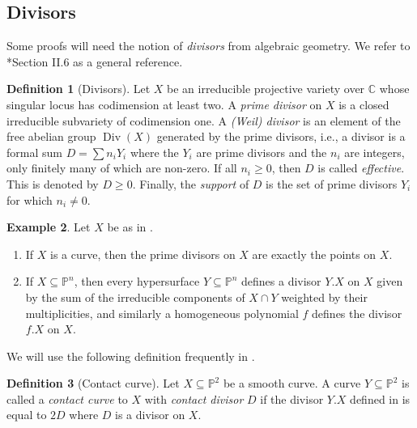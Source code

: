 \documentclass[a4paper,10pt]{amsart}
\theoremstyle{definition}
\newtheorem{Def}{Definition}[section]
\newtheorem{ex}[Def]{Example}
\theoremstyle{plain}
\newcommand{\Div}{\operatorname{Div}}
\newcommand{\C}{{\mathbb C}}
\newcommand{\pp}{\mathbb{P}}
\begin{document}
\subsection{Divisors}
Some proofs will need the notion of \emph{divisors} from algebraic geometry. We refer to \cite{Hartshorne1977AG}*{Section II.6} as a general reference.
\begin{Def}[Divisors]\label{def:divisors}
    Let $X$ be an irreducible projective variety over $\C$ whose singular locus has codimension at least two. A \emph{prime divisor} on $X$ is a closed irreducible subvariety of codimension one. A \emph{(Weil) divisor} is an element of the free abelian group $\Div(X)$ generated by the prime divisors, i.e., a divisor is a formal sum $D=\sum n_i Y_i$ where the $Y_i$ are prime divisors and the $n_i$ are integers, only finitely many of which are non-zero. If all $n_i\geq0$, then $D$ is called \emph{effective}. This is denoted by $D\geq0$. Finally, the \emph{support} of $D$ is the set of prime divisors $Y_i$ for which $n_i\neq0$.
\end{Def}
\begin{ex}\label{ex:hyperplanedivisor}
Let $X$ be as in .
\begin{enumerate}
    \item If $X$ is a curve, then the prime divisors on $X$ are exactly the points on $X$.
    \item If $X\subseteq\pp^n$, then every hypersurface $Y\subseteq\pp^n$ defines a divisor $Y.X$ on $X$ given by the sum of the irreducible components of $X\cap Y$ weighted by their multiplicities, and similarly a homogeneous polynomial $f$ defines the divisor $f.X$ on $X$.
\end{enumerate}
\end{ex}
We will use the following definition frequently in .
\begin{Def}[Contact curve]
    Let $X\subseteq\pp^2$ be a smooth curve. A curve $Y\subseteq\pp^2$ is called a \emph{contact curve} to $X$ with \emph{contact divisor} $D$ if the divisor $Y.X$ defined in  is equal to $2D$ where $D$ is a divisor on $X$.
\end{Def}
\end{document}
